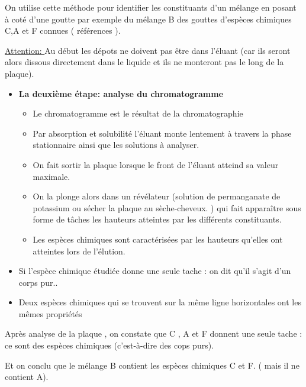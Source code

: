 \documentclass[12pt]{article}
\begin{document}
On utilise cette méthode pour identifier les constituants d'un mélange en posant à coté d'une goutte par exemple du
mélange B des gouttes d'espèces chimiques C,A et F connues ( références ).

\underline{Attention: }Au début les dépots ne doivent pas être dans l'éluant (car ils seront alors dissous directement dans le
liquide et ils ne monteront pas le long de la plaque).

\begin{itemize}
	\item \textbf{La deuxième étape: analyse du chromatogramme }
		\begin{itemize}
			\item Le chromatogramme est le résultat de la chromatographie
			\item Par absorption et solubilité l’éluant monte lentement à travers la phase stationnaire ainsi que les solutions à
analyser.
\item On fait sortir la plaque lorsque le front de l'éluant atteind sa valeur maximale.
\item On la plonge alors dans un révélateur (solution de permanganate de potassium ou sécher la plaque au sèche-cheveux.
) qui fait apparaître sous forme de tâches les hauteurs atteintes par les différents constituants.

\item Les espèces chimiques sont caractérisées par les hauteurs qu'elles ont atteintes lors de l'élution.

		\end{itemize}
	\item Si l'espèce chimique étudiée donne une seule tache : on dit qu'il s'agit d'un corps pur..
	\item Deux espèces chimiques qui se trouvent sur la même ligne horizontales ont les mêmes propriétés

\end{itemize}

Après analyse de la plaque , on constate que C , A et F donnent une seule tache : ce sont des espèces chimiques
(c'est-à-dire des cops purs).

Et on conclu que le mélange B contient les espèces chimiques C et F. ( mais il ne contient A).
\end{document}
